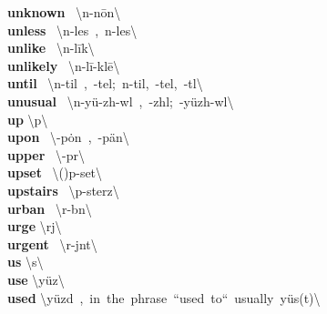 \documentclass[10pt,a4paper]{article}
\begin{document}
\begin{multicols}{2}
\textbf{ unknown }\quad \ \textbackslash \textsecstress \textschwa n-\textprimstress n\={o}n\textbackslash \\
\textbf{ unless }\quad \ \textbackslash \textschwa n-\textprimstress les\ ,\ \textprimstress \textschwa n-\textsecstress les\textbackslash \\
\textbf{ unlike }\quad \ \textbackslash \textsecstress \textschwa n-\textprimstress l\={i}k\textbackslash \\
\textbf{ unlikely }\quad \ \textbackslash \textsecstress \textschwa n-\textprimstress l\={i}-kl\={e}\textbackslash \\
\textbf{ until }\quad \ \textbackslash \textschwa n-\textprimstress til\ ,\ -\textprimstress tel;\ \textprimstress \textschwa n-\textsecstress til,\ -\textsecstress tel,\ -t\textsuperscript{\textreve}l\textbackslash \\
\textbf{ unusual }\quad \ \textbackslash \textsecstress \textschwa n-\textprimstress y\"{u}-zh\textschwa -w\textschwa l\ ,\ -zh\textschwa l;\ -\textprimstress y\"{u}zh-w\textschwa l\textbackslash \\
\textbf{ up }\quad \textbackslash \textprimstress \textschwa p\textbackslash \\
\textbf{ upon }\quad \ \textbackslash \textschwa -\textprimstress p\.{o}n\ ,\ -\textprimstress p\"{a}n\textbackslash \\
\textbf{ upper }\quad \ \textbackslash \textprimstress \textschwa -p\textschwa r\textbackslash \\
\textbf{ upset }\quad \ \textbackslash (\textsecstress )\textschwa p-\textprimstress set\textbackslash \\
\textbf{ upstairs }\quad \ \textbackslash \textsecstress \textschwa p-\textprimstress sterz\textbackslash \\
\textbf{ urban }\quad \ \textbackslash \textprimstress \textschwa r-b\textschwa n\textbackslash \\
\textbf{ urge }\quad \textbackslash \textprimstress \textschwa rj\textbackslash \\
\textbf{ urgent }\quad \ \textbackslash \textprimstress \textschwa r-j\textschwa nt\textbackslash \\
\textbf{ us }\quad \textbackslash \textprimstress \textschwa s\textbackslash \\
\textbf{ use }\quad \textbackslash \textprimstress y\"{u}z\textbackslash \\
\textbf{ used }\quad \textbackslash \textprimstress y\"{u}zd\ ,\ in\ the\ phrase\ ``used\ to``\ usually\ \textprimstress y\"{u}s(t)\textbackslash \\

\end{multicols}
\end{document}
